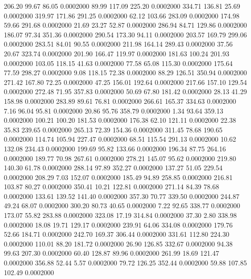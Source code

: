  206.20   99.67   86.05   0.0002000
  89.99  117.09  225.20   0.0002000
 334.71  136.81   25.69   0.0002000
 319.97  171.86  291.25   0.0002000
  62.12  103.66  283.09   0.0002000
 174.98   59.66  291.68   0.0002000
  21.69   23.27   52.87   0.0002000
 286.94   84.71  129.86   0.0002000
 186.07   97.34  351.36   0.0002000
 290.54  173.30   94.11   0.0002000
 203.57  169.79  299.06   0.0002000
 283.51   84.01   90.55   0.0002000
 211.98  164.14  289.43   0.0002000
  37.56   20.67  323.74   0.0002000
 201.90  166.47  119.97   0.0002000
 181.63  100.24  201.93   0.0002000
 103.05  118.15   41.63   0.0002000
  77.58   65.08  115.30   0.0002000
 175.64   77.59  298.27   0.0002000
   9.08  118.15   72.38   0.0002000
  88.29  126.51  350.94   0.0002000
 271.42  167.80   72.25   0.0002000
  47.25  156.01  192.64   0.0002000
 217.66  157.10  129.54   0.0002000
 272.48   71.95  357.83   0.0002000
  50.69   67.80  181.42   0.0002000
  28.13   41.29  158.98   0.0002000
 283.89   89.61   76.81   0.0002000
 266.61  165.37  334.63   0.0002000
   7.16   96.04   95.81   0.0002000
  20.86   95.76  358.79   0.0002000
   1.34   93.64  359.13   0.0002000
 100.21  100.20  181.53   0.0002000
 176.38   62.10  121.11   0.0002000
  22.38   35.83  239.65   0.0002000
 265.13   72.39  154.36   0.0002000
 311.45   78.68  190.65   0.0002000
 114.74  105.94  227.47   0.0002000
  68.51  115.54  291.13   0.0002000
  10.62  132.08  234.43   0.0002000
 199.69   95.82  133.66   0.0002000
 196.34   87.75  264.16   0.0002000
 189.77   70.98  267.61   0.0002000
 278.21  145.07   95.62   0.0002000
 219.80  140.30   61.78   0.0002000
 288.14   97.89  352.27   0.0002000
 137.27   51.05  229.54   0.0002000
 208.29    7.03  152.07   0.0002000
 185.49   94.89  258.85   0.0002000
 216.81  103.87   80.27   0.0002000
 350.41   10.21  122.81   0.0002000
 271.14   84.39   78.68   0.0002000
 133.61  139.52  141.40   0.0002000
 357.30   70.77  339.50   0.0002000
 244.87   49.24   68.07   0.0002000
 300.20   80.73   40.65   0.0002000
   7.22   92.65  338.77   0.0002000
 173.07   55.82  283.88   0.0002000
 323.08   17.19  314.84   0.0002000
  37.30    2.80  338.98   0.0002000
  18.08   19.71  129.17   0.0002000
 239.91   64.06  334.08   0.0002000
 179.76   52.66  184.71   0.0002000
 242.70  169.37  306.44   0.0002000
 331.61  112.80  224.30   0.0002000
 110.01   88.20  181.72   0.0002000
  26.90  126.85  332.67   0.0002000
  94.38   99.63  207.30   0.0002000
  60.40  128.87   89.96   0.0002000
 261.99   18.69  121.47   0.0002000
 356.88   52.44    5.57   0.0002000
  79.72  126.25  352.44   0.0002000
  59.88  107.85  102.49   0.0002000

